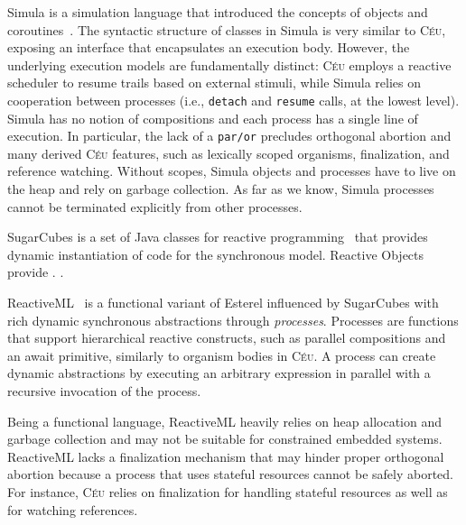 \documentclass{acm_proc_article-sp}
\newcommand{\CEU}{\textsc{C\'{e}u}\xspace}
\newcommand{\code}[1] {{\small{\texttt{#1}}}}
\newcommand{\1}{\;}
\newcommand{\2}{\;\;}
\newcommand{\3}{\;\;\;}
\newcommand{\5}{\;\;\;\;\;}
\begin{document}
Simula is a simulation language that introduced the concepts of objects and 
coroutines~\cite{simula}.
%
The syntactic structure of classes in Simula is very similar to \CEU, exposing 
an interface that encapsulates an execution body.
%
However, the underlying execution models are fundamentally distinct:
\CEU employs a reactive scheduler to resume trails based on external stimuli, 
while Simula relies on cooperation between processes (i.e., \code{detach} and 
\code{resume} calls, at the lowest level).
%
Simula has no notion of compositions and each process has a single line of 
execution.
In particular, the lack of a \code{par/or} precludes orthogonal abortion and 
many derived \CEU features, such as lexically scoped organisms, finalization, 
and reference watching.
%
Without scopes, Simula objects and processes have to live on the heap and rely 
on garbage collection.
As far as we know, Simula processes cannot be terminated explicitly from other 
processes.
%

SugarCubes is a set of Java classes for reactive programming~\cite{sugarcubes} 
that provides dynamic instantiation of code for the synchronous model.
%
Reactive Objects provide .
\cite{rp.oo}.

ReactiveML~\cite{rml} is a functional variant of Esterel influenced by 
SugarCubes with rich dynamic synchronous abstractions through \emph{processes}.
Processes are functions that support hierarchical reactive constructs, such as 
parallel compositions and an await primitive, similarly to organism bodies in 
\CEU.
A process can create dynamic abstractions by executing an arbitrary expression 
in parallel with a recursive invocation of the process.


%
Being a functional language, ReactiveML heavily relies on heap allocation and 
garbage collection and may not be suitable for constrained embedded systems.
%
%
ReactiveML lacks a finalization mechanism that may hinder proper orthogonal 
abortion because a process that uses stateful resources cannot be safely 
aborted.
For instance, \CEU relies on finalization for handling stateful resources as 
well as for watching references.

\end{document}
